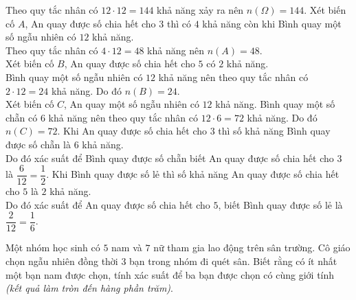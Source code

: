 \begin{ex}
{\begin{itemchoice}
			Theo quy  tắc nhân có $12\cdot 12=144$ khả năng xảy ra nên $n\left(\Omega\right) =144$.
			 \itemch
			Xét biến cố $A$, An quay được số chia hết cho $3$ thì có $4$ khả năng còn khi Bình quay một số ngẫu  nhiên có $12$ khả năng.\\
			Theo quy tắc nhân có  $4\cdot 12=48$ khả năng nên $n\left(A\right)=48$.\\
			Xét biến cố $B$, An quay được số chia hết cho $5$ có $2$ khả năng.\\ 
			Bình quay một số ngẫu nhiên có $12$ khả năng nên theo quy tắc nhân có $2\cdot 12=24$ khả năng. Do  đó $n\left(B\right)=24$.\\
			Xét biến cố $C$, An quay một số ngẫu nhiên có $12$ khả năng. Bình quay một số chẵn có $6$ khả năng nên theo quy tắc nhân có $12\cdot 6=72$  khả năng. Do đó $n\left(C\right)=72$.
			\itemch 
			Khi An quay được số  chia hết cho $3$ thì số khả năng Bình quay được số chẵn là $6$ khả năng.\\
			Do đó xác suất để Bình quay được số chẵn  biết An quay được số chia hết cho $3$ là $\dfrac{6}{12}=\dfrac{1}{2}$.
			\itemch 
			Khi Bình quay được số lẻ thì số khả năng An quay được số chia hết cho $5$  là $2$ khả năng. \\
			Do đó xác suất để An quay được số chia hết  cho $5$, biết Bình quay được số lẻ là $\dfrac{2}{12}=\dfrac{1}{6}$.
		\end{itemchoice}
	} 
\end{ex}



\begin{bt}%
	Một nhóm học sinh có $5$ nam và $7$ nữ tham gia lao động trên sân trường. Cô giáo chọn ngẫu nhiên đồng thời $3$ bạn trong nhóm đi quét sân. Biết rằng có ít nhất một bạn nam được chọn, tính xác suất để ba bạn được chọn có cùng giới tính \textit{(kết quả làm  tròn đến hàng phần trăm)}.
\end{bt}



